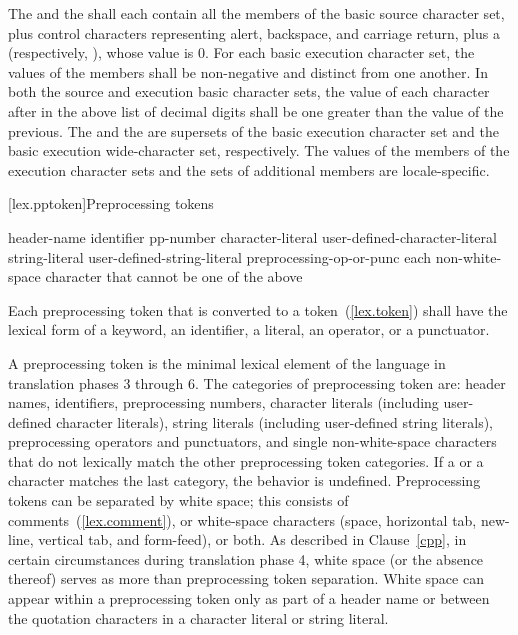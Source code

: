 \pnum
The  and the  shall each contain all the members of the
basic source character set, plus control characters representing alert,
backspace, and carriage return, plus a 
(respectively, ), whose value is 0.
For each basic execution character set, the values of the
members shall be non-negative and distinct from one another. In both the
source and execution basic character sets, the value of each character
after  in the above list of decimal digits shall be one greater
than the value of the previous. The 
and the  are
supersets of the
basic execution character set and the basic execution wide-character
set, respectively. The values of the members of the execution character sets
and the sets of additional members
are locale-specific.%

[lex.pptoken]{Preprocessing tokens}

%
\begin{bnf}
\br
    header-name\br
    identifier\br
    pp-number\br
    character-literal\br
    user-defined-character-literal\br
    string-literal\br
    user-defined-string-literal\br
    preprocessing-op-or-punc\br
    \textnormal{each non-white-space character that cannot be one of the above}
\end{bnf}

\pnum
Each preprocessing token that is converted to a token~(\ref{lex.token})
shall have the lexical form of a keyword, an identifier, a literal, an
operator, or a punctuator.

\pnum
A preprocessing token is the minimal lexical element of the language in translation
phases 3 through 6. The categories of preprocessing token are: header names,
identifiers, preprocessing numbers, character literals (including user-defined character
literals), string literals (including user-defined string literals), preprocessing
operators and punctuators, and single non-white-space characters that do not lexically
match the other preprocessing token categories. If a  or a  character
matches the last category, the behavior is undefined. Preprocessing tokens can be
separated by
%
white space;
%
this consists of comments~(\ref{lex.comment}), or white-space
characters (space, horizontal tab, new-line, vertical tab, and
form-feed), or both. As described in Clause~\ref{cpp}, in certain
circumstances during translation phase 4, white space (or the absence
thereof) serves as more than preprocessing token separation. White space
can appear within a preprocessing token only as part of a header name or
between the quotation characters in a character literal or string
literal.

